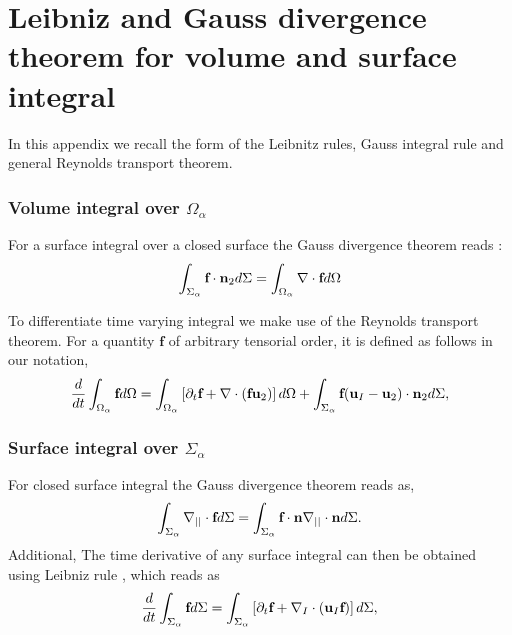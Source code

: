 \section{Leibniz and Gauss divergence theorem for volume and surface integral}
\label{ap:math}

In this appendix we recall the form of the Leibnitz rules, Gauss integral rule and general Reynolds transport theorem. 
\subsubsection*{Volume integral over $\Omega_\alpha$}
For a surface integral over a closed surface the Gauss divergence theorem reads : 
\begin{equation}
    \int_{\Sigma_\alpha} \textbf{f} \cdot \textbf{n}_2 d\Sigma
    = \int_{\Omega_\alpha} \mathbf{\nabla} \cdot \textbf{f}d\Omega
\end{equation}

To differentiate time varying integral we make use of the Reynolds transport theorem.
For a quantity $\textbf{f}$ of arbitrary tensorial order, it is defined  as follows in our notation, 
\begin{equation}
    \frac{d}{d t} \int_{\Omega_\alpha} \textbf{f} d\Omega
    = \int_{\Omega_\alpha}\left[\partial_t \textbf{f} + \mathbf{\nabla} \cdot\left(\textbf{f}\textbf{u}_2\right) \right]d\Omega\\
    + \int_{\Sigma_\alpha} \textbf{f} (\textbf{u}_I-\textbf{u}_2)\cdot \textbf{n}_2 d\Sigma,
    \label{eq:Reynolds}
\end{equation}


\subsubsection*{Surface integral over $\Sigma_\alpha$}

For closed surface integral the Gauss divergence theorem reads as, 
\begin{equation}
    \int_{\Sigma_\alpha}  \mathbf{\nabla}_{||}  \cdot \textbf{f} d\Sigma
    = 
    \int_{\Sigma_\alpha}  \textbf{f} \cdot \textbf{n}\mathbf{\nabla}_{||}\cdot\textbf{n} d\Sigma. 
    \label{eq:surf_div_theorem}
\end{equation}
Additional, The time derivative of any surface integral can then be obtained using Leibniz rule  \citep{morel2015mathematical}, which reads as  
\begin{equation}
    \frac{d}{d t} \int_{\Sigma_\alpha} \textbf{f} d\Sigma 
    = \int_{\Sigma_\alpha} \left[
        \partial_t \textbf{f} 
        +   \mathbf{\nabla}_I \cdot (\textbf{u}_I\textbf{f})
    \right]d\Sigma,
    \label{eq:Leibnitz}
\end{equation}

